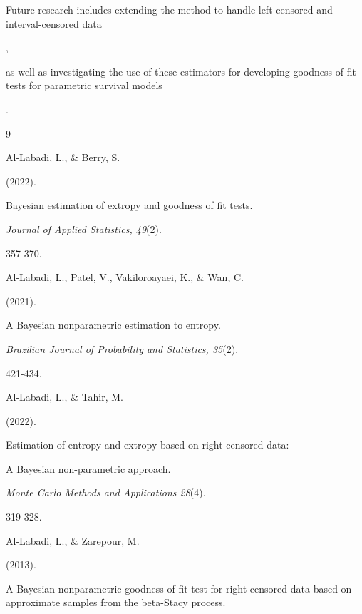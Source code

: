 \documentclass[10pt,twoside]{article}
\numberwithin{equation}{section}
\begin{document}
Future research includes extending the method to handle left-censored and interval-censored data 

\citep{8}, 

as well as investigating the use of these estimators for developing goodness-of-fit tests for parametric survival models 

\citep{1,3}. 






\begin{thebibliography}{9}


Al-Labadi, L., \& Berry, S. 

(2022). 

Bayesian estimation of extropy and goodness of fit tests. 

\textit{Journal of Applied Statistics, 49}(2).

357-370. 



Al-Labadi, L., Patel, V., Vakiloroayaei, K., \& Wan, C. 

(2021). 

A Bayesian nonparametric estimation to entropy. 

\textit{Brazilian Journal of Probability and Statistics, 35}(2).

421-434. 



Al-Labadi, L., \& Tahir, M. 

(2022). 

Estimation of entropy and extropy based on right censored data: 

A Bayesian non-parametric approach.

\textit{Monte Carlo Methods and Applications 28}(4).

319-328.



Al-Labadi, L., \& Zarepour, M. 

(2013). 

A Bayesian nonparametric goodness of fit test for right censored data based on approximate samples from the beta-Stacy process. 


\end{thebibliography}
\end{document}
